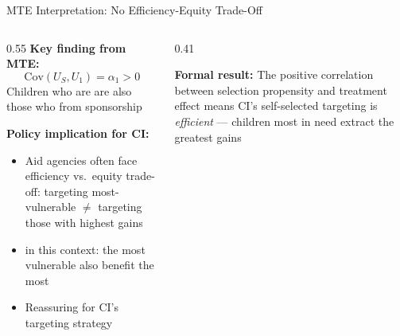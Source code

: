 \documentclass[aspectratio=169, 10pt]{beamer}
\begin{document}
\begin{frame}{MTE Interpretation: No Efficiency-Equity Trade-Off}
  \begin{columns}
    \begin{column}{0.55\textwidth}
      \textbf{Key finding from MTE:}
      \[
        \mathrm{Cov}(U_S, U_1) = \alpha_1 > 0
      \]
      Children who are  are also those who  from sponsorship

      \vspace{0.5em}
      \textbf{Policy implication for CI:}
      \begin{itemize}
        \item Aid agencies often face efficiency vs.\ equity trade-off: targeting most-vulnerable $\neq$ targeting those with highest gains
        \item {} in this context: the most vulnerable also benefit the most
        \item Reassuring for CI's targeting strategy
      \end{itemize}
    \end{column}
    \begin{column}{0.41\textwidth}
      \begin{resultbox}
        \textbf{Formal result:} The positive correlation between selection propensity and treatment effect means CI's self-selected targeting is \textit{efficient} — children most in need extract the greatest gains
      \end{resultbox}
    \end{column}
  \end{columns}
\end{frame}
\end{document}

